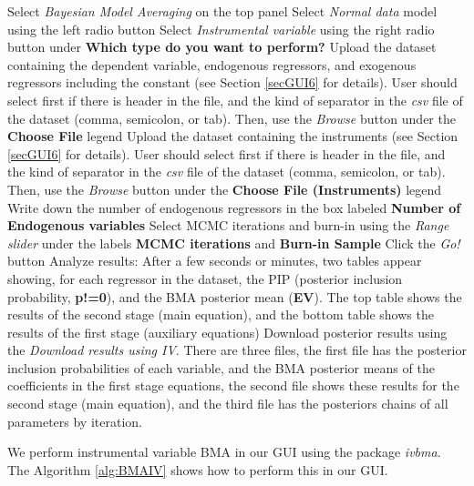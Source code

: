 \begin{algorithm}[h!]
	\caption{Instrumental variable Bayesian model averaging in linear Gaussian models}\label{alg:BMAIV}
	\begin{algorithmic}[1]  		 			
		\State Select \textit{Bayesian Model Averaging} on the top panel
		\State Select \textit{Normal data} model using the left radio button
		\State Select \textit{Instrumental variable} using the right radio button under \textbf{Which type do you want to perform?}
		\State Upload the dataset containing the dependent variable, endogenous regressors, and exogenous regressors including the constant (see Section \ref{secGUI6} for details).  User should select first if there is header in the file, and the kind of separator in the \textit{csv} file of the dataset (comma, semicolon, or tab). Then, use the \textit{Browse} button under the \textbf{Choose File} legend
		\State Upload the dataset containing the instruments (see Section \ref{secGUI6} for details).  User should select first if there is header in the file, and the kind of separator in the \textit{csv} file of the dataset (comma, semicolon, or tab). Then, use the \textit{Browse} button under the \textbf{Choose File (Instruments)} legend
		\State Write down the number of endogenous regressors in the box labeled \textbf{Number of Endogenous variables}
		\State Select MCMC iterations and burn-in using the \textit{Range slider} under the labels \textbf{MCMC iterations} and \textbf{Burn-in Sample}
		\State Click the \textit{Go!} button
		\State Analyze results: After a few seconds or minutes, two tables appear showing, for each regressor in the dataset, the PIP (posterior inclusion probability, \textbf{p!=0}), and the BMA posterior mean (\textbf{EV}). The top table shows the results of the second stage (main equation), and the bottom table shows the results of the first stage (auxiliary equations)
		\State Download posterior results using the \textit{Download results using IV}. There are three files, the first file has the posterior inclusion probabilities of each variable, and the BMA posterior means of the coefficients in the first stage equations, the second file shows these results for the second stage (main equation), and the third file has the posteriors chains of all parameters by iteration. 
	\end{algorithmic} 
\end{algorithm}

We perform instrumental variable BMA in our GUI using the package \textit{ivbma}. The Algorithm \ref{alg:BMAIV} shows how to perform this in our GUI. 

